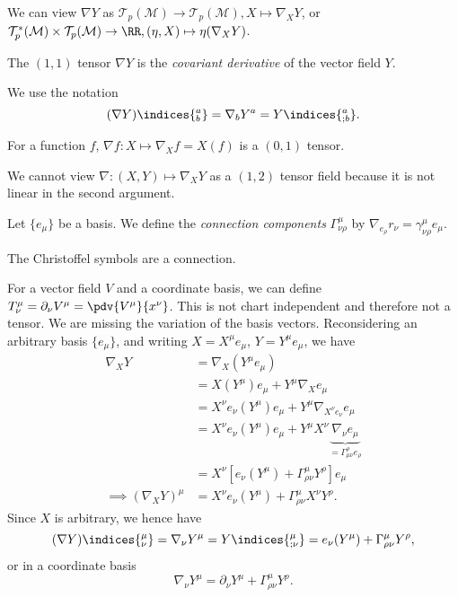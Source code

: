 \documentclass{jknotes}
\begin{document}
We can view \(\nabla Y\) as \(\mathcal{T}_p(\mathcal{M}) \to \mathcal{T}_p(\mathcal{M}), X \mapsto \nabla_XY\), or \(\mathcal{T}_p^*(\mathcal{M})\times\mathcal{T}_p(\mathcal{M}) \to \RR, (\eta,X) \mapsto \eta(\nabla_X Y)\).
\begin{defn}
    The \((1,1)\) tensor \(\nabla Y\) is the \emph{covariant derivative} of the vector field \(Y\).
\end{defn}
We use the notation
\begin{equation}
    (\nabla Y)\indices{^a_b} = \nabla_b Y^a = Y\indices{^a_{;b}}.
\end{equation}

For a function \(f\), \(\nabla f:X\mapsto\nabla_X f = X(f)\) is a \((0,1)\) tensor. 

We cannot view \(\nabla:(X,Y) \mapsto \nabla_X Y\) as a \((1,2)\) tensor field because it is not linear in the second argument.

\begin{defn}
    Let \(\{e_\mu\}\) be a basis. We define the \emph{connection components} \(\Gamma^\mu_{\nu\rho}\) by \(\nabla_{e_\rho}r_\nu = \gamma^\mu_{\nu\rho}e_\mu\).
\end{defn}
\begin{eg}
    The Christoffel symbols are a connection.
\end{eg}

For a vector field \(V\) and a coordinate basis, we can define \(T^\mu_\nu = \partial_\nu V^\mu = \pdv{V^\mu}{x^\nu}\). This is not chart independent and therefore not a tensor. We are missing the variation of the basis vectors. Reconsidering an arbitrary basis \(\{e_\mu\}\), and writing \(X=X^\mu e_\mu\), \(Y=Y^\mu e_\mu\), we have
\begin{align}
    \nabla_XY &= \nabla_X(Y^\mu e_\mu) \\
              &= X(Y^\mu) e_\mu + Y^\mu \nabla_X e_\mu \\
              &= X^\nu e_\nu (Y^\mu)e_\mu + Y^\mu\nabla_{X^\nu e_\nu}e_\mu \\
              &= X^\nu e_\nu (Y^\mu)e_\mu + Y^\mu X^\nu \underbrace{\nabla_\nu e_\mu}_{=\Gamma^\rho_{\mu\nu}e_\rho} \\
              &= X^\nu[e_\nu(Y^\mu) + \Gamma^\mu_{\rho\nu}Y^\rho]e_\mu \\
    \implies (\nabla_X Y)^\mu &= X^\nu e_\nu(Y^\mu) + \Gamma^\mu_{\rho\nu} X^\nu Y^\rho.
\end{align}
Since \(X\) is arbitrary, we hence have
\begin{equation}
    (\nabla Y)\indices{^\mu_\nu} = \nabla_\nu Y^\mu = Y\indices{^\mu_{;\nu}} = e_\nu(Y^\mu) + \Gamma^\mu_{\rho\nu}Y^\rho,
\end{equation}
or in a coordinate basis
\begin{equation}
    \nabla_\nu Y^\mu = \partial_\nu Y^\mu + \Gamma^\mu_{\rho\nu} Y^\rho.
\end{equation}
\end{document}

